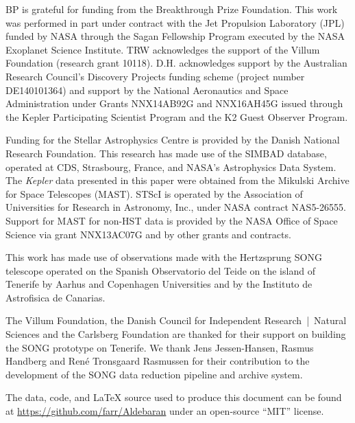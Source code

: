 \documentclass[modern]{aastex61}
\newcommand{\kepler}{\emph{Kepler}\xspace}
\begin{document}
BP is grateful for funding from the Breakthrough Prize Foundation. This work was performed in part under contract with the Jet Propulsion Laboratory (JPL) funded by NASA through the Sagan Fellowship Program executed by the NASA Exoplanet Science Institute.
TRW acknowledges the support of the Villum Foundation (research grant 10118).
D.H. acknowledges support by the Australian Research Council's Discovery Projects funding scheme (project number DE140101364) and support by the National Aeronautics and Space Administration under Grants NNX14AB92G and NNX16AH45G issued through the Kepler Participating Scientist Program and the K2 Guest Observer Program.

Funding for the Stellar Astrophysics Centre is provided by the Danish National Research Foundation.
This research has made use of the SIMBAD database, operated at CDS, Strasbourg, France, and NASA's Astrophysics Data System. The \kepler data presented in this paper were obtained from the Mikulski Archive for Space Telescopes (MAST). STScI is operated by the Association of Universities for Research in Astronomy, Inc., under NASA contract NAS5-26555. Support for MAST for non-HST data is provided by the NASA Office of Space Science via grant NNX13AC07G and by other grants and contracts.

This work has made use of observations made with the Hertzsprung SONG telescope operated on the Spanish Observatorio
  del Teide on the island of Tenerife by Aarhus and Copenhagen Universities and by the Instituto de
  Astrofisica de Canarias.

The Villum Foundation, the Danish Council for Independent Research~|~Natural Sciences and
 the Carlsberg Foundation are thanked for their support on building the SONG prototype on
 Tenerife.
 We thank Jens Jessen-Hansen, Rasmus Handberg and René Tronsgaard Rasmussen for their contribution
 to the development of the SONG data reduction pipeline and archive system.


The data, code, and \LaTeX{} source used to produce this document can be found
at \url{https://github.com/farr/Aldebaran} under an open-source ``MIT'' license.

\end{document}
